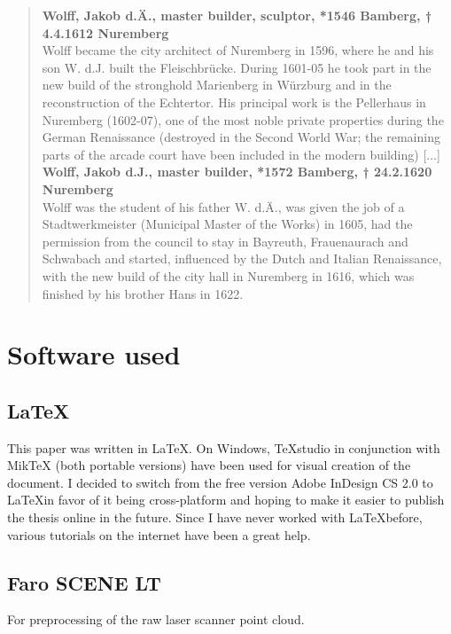 \blockquote{
	
	\textbf{Wolff, Jakob d.Ä., master builder, sculptor, *1546 Bamberg, † 4.4.1612 Nuremberg} \\
	Wolff became the city architect of Nuremberg in 1596, where he and his son W. d.J. built the Fleischbrücke. During 1601-05 he took part in the new build of the stronghold Marienberg in Würzburg and in the reconstruction of the Echtertor. His principal work is the Pellerhaus in Nuremberg (1602-07), one of the most noble private properties during the German Renaissance (destroyed in the Second World War; the remaining parts of the arcade court have been included in the modern building) [...] \\
	
	\textbf{Wolff, Jakob d.J., master builder, *1572 Bamberg, † 24.2.1620 Nuremberg} \\
	Wolff was the student of his father W. d.Ä., was given the job of a Stadtwerkmeister (Municipal Master of the Works) in 1605, had the permission from the council to stay in Bayreuth, Frauenaurach and Schwabach and started, influenced by the Dutch and Italian Renaissance, with the new build of the city hall in Nuremberg in 1616, which was finished by his brother Hans in 1622. \\
	
}





\section{Software used}

\subsection{\LaTeX}
This paper was written in \LaTeX. On Windows, TeXstudio in conjunction with MikTeX (both portable versions) have been used for visual creation of the document. I decided to switch from the free version Adobe InDesign CS 2.0 to \LaTeX in favor of it being cross-platform and hoping to make it easier to publish the thesis online in the future. Since I have never worked with \LaTeX before, various tutorials \parencite{ytLaTeX,webLaTeX-Tutorial} on the internet have been a great help.

\subsection{Faro SCENE LT}
For preprocessing of the raw laser scanner point cloud.

